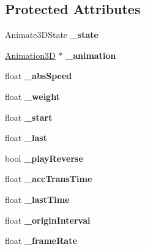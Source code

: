 \subsection*{Protected Attributes}
\begin{DoxyCompactItemize}
\item 
\mbox{\label{classAnimate3D_a7b8f4d0be59ae9e4d99496078df71725}} 
Animate3\+D\+State {\bfseries \+\_\+state}
\item 
\mbox{\label{classAnimate3D_a9ae458de1f95f28ba39b72d690fda4da}} 
\hyperlink{classAnimation3D}{Animation3D} $\ast$ {\bfseries \+\_\+animation}
\item 
\mbox{\label{classAnimate3D_a5a0f2183f7aa1ebf7ed8c0cccb7397eb}} 
float {\bfseries \+\_\+abs\+Speed}
\item 
\mbox{\label{classAnimate3D_ab9a3ce70fb11b207a0dcb3269af75dde}} 
float {\bfseries \+\_\+weight}
\item 
\mbox{\label{classAnimate3D_a8a760b69b8713adf6c9f463a0438b692}} 
float {\bfseries \+\_\+start}
\item 
\mbox{\label{classAnimate3D_a52adc7660c518c2403ec33e0deeae7dd}} 
float {\bfseries \+\_\+last}
\item 
\mbox{\label{classAnimate3D_a283d70144f1ba04f81accb5a8ab849b8}} 
bool {\bfseries \+\_\+play\+Reverse}
\item 
\mbox{\label{classAnimate3D_ad6ee01452ef2437bb6e0289525b795b3}} 
float {\bfseries \+\_\+acc\+Trans\+Time}
\item 
\mbox{\label{classAnimate3D_a9b9c80deb5c151285df6e1d0ae72291d}} 
float {\bfseries \+\_\+last\+Time}
\item 
\mbox{\label{classAnimate3D_a255e2f108385eaf550975621c54d80d3}} 
float {\bfseries \+\_\+origin\+Interval}
\item 
\mbox{\label{classAnimate3D_aa0f6dc74ccd17e1d31008b24fac54c08}} 
float {\bfseries \+\_\+frame\+Rate}

\end{DoxyCompactItemize}
